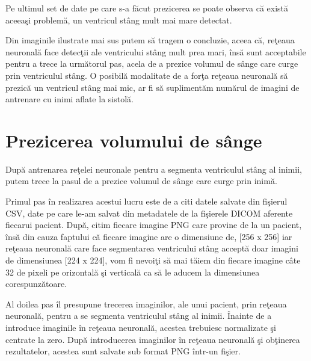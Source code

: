 Pe ultimul set de date pe care s-a f\u{a}cut prezicerea se poate observa c\u{a} exist\u{a} aceea\c{s}i problem\u{a}, un ventricul st\^{a}ng mult mai mare detectat.

\par

Din imaginile ilustrate mai sus putem s\u{a} tragem o concluzie, aceea c\u{a}, re\c{t}eaua neuronal\u{a} face detec\c{t}ii ale ventricului st\^{a}ng mult prea mari, \^{i}ns\u{a} sunt acceptabile pentru a trece la urm\u{a}torul pas, acela de a prezice volumul de s\^{a}nge care curge prin ventriculul st\^{a}ng. O posibil\u{a} modalitate de a for\c{t}a re\c{t}eaua neuronal\u{a} s\u{a} prezic\u{a} un ventricul st\^{a}ng mai mic, ar fi s\u{a} supliment\u{a}m num\u{a}rul de imagini de antrenare cu inimi aflate la sistol\u{a}.

\section{Prezicerea volumului de s\^{a}nge}

Dup\u{a} antrenarea re\c{t}elei neuronale pentru a segmenta ventriculul st\^{a}ng al inimii, putem trece la pasul de a prezice volumul de s\^{a}nge care curge prin inim\u{a}.

\par

Primul pas \^{i}n realizarea acestui lucru este de a citi datele salvate din fi\c{s}ierul CSV, date pe care le-am salvat din metadatele de la fi\c{s}ierele DICOM aferente fiecarui pacient. Dup\u{a}, citim fiecare imagine PNG care provine de la un pacient, \^{i}ns\u{a} din cauza faptului c\u{a} fiecare imagine are o dimensiune de, [256 x 256] iar re\c{t}eaua neuronal\u{a} care face segmentarea ventricului st\^{a}ng accept\u{a} doar imagini de dimensiunea [224 x 224], vom fi nevoi\c{t}i s\u{a} mai t\u{a}iem din fiecare imagine c\^{a}te 32 de pixeli pe orizontal\u{a} \c{s}i vertical\u{a} ca s\u{a} le aducem la dimensiunea corespunz\u{a}toare.

\par

Al doilea pas \^{i}l presupune trecerea imaginilor, ale unui pacient, prin re\c{t}eaua neuronal\u{a}, pentru a se segmenta ventriculul st\^{a}ng al inimii. \^{I}nainte de a introduce imaginile \^{i}n re\c{t}eaua neuronal\u{a}, acestea trebuiesc normalizate \c{s}i centrate la zero. Dup\u{a} introducerea imaginilor \^{i}n re\c{t}eaua neuronal\u{a} \c{s}i ob\c{t}inerea rezultatelor, acestea sunt salvate sub format PNG \^{i}ntr-un fi\c{s}ier.

